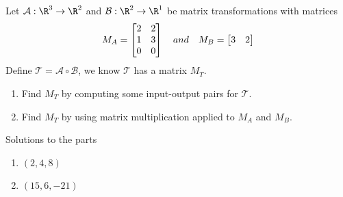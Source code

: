 \begin{exercises}
\begin{problist}
		\prob Let $\mathcal A: \R^3 \to \R^2$ and $\mathcal B: \R^2 \to \R^1$ be matrix transformations with matrices
		\[
		    M_A = \mat{2&2\\1&3\\0&0} \quad and \quad M_B = \mat{3&2}
		\]
		Define $\mathcal T = \mathcal A \circ \mathcal B$, we know $\mathcal T$ has a matrix $M_T$. 
		\begin{enumerate}
		    \item Find $M_T$ by computing some input-output pairs for $\mathcal T$.
		    \item Find $M_T$ by using matrix multiplication applied to $M_A$ and $M_B$. 
		\end{enumerate}
		
		\begin{solution}
		Solutions to the parts
			\begin{enumerate}
				\item   $(2,4,8)$
				\item   $(15,6,-21)$
			\end{enumerate}
		\end{solution}

	\end{problist}
\end{exercises}
